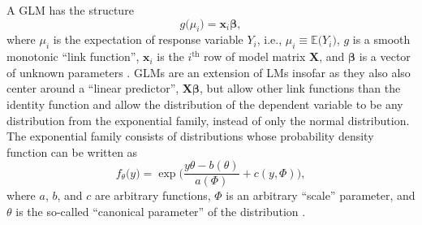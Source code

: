 A GLM has the structure
\begin{equation}
  \label{eq:GeneralizedLinearModel}
  g\bigl(\mu_i\bigr) = \symbf{x}_i \symbf{\beta},  %
\end{equation}
where \(\mu_i\) is the expectation of response variable \(Y_i\), i.e., \(\mu_i \equiv \mathbb{E}\bigl(Y_i\bigr)\), \(g\) is a smooth monotonic ``link function'', \(\symbf{x}_i\) is the \(i^{\text{th}}\) row of model matrix \(\symbf{X}\), and \(\symbf{\beta}\) is a vector of unknown parameters \parencite{Wood2006,Nelder1972}.
GLMs are an extension of LMs insofar as they also also center around a ``linear predictor'', \(\symbf{X}\symbf{\beta}\), but allow other link functions than the identity function and allow the distribution of the dependent variable to be any distribution from the exponential family, instead of only the normal distribution.  The exponential family consists of distributions whose probability density function can be written as
\begin{equation}
  \label{eq:ExponentialFamilyProbabilityDensityFunction}
  f_{\theta}\bigl(y\bigr) = \exp \bigg( \frac{y \theta - b(\theta)}{a(\Phi)} + c(y, \Phi)\bigg),
\end{equation}
where \(a\), \(b\), and \(c\) are arbitrary functions, \(\Phi\) is an arbitrary ``scale'' parameter, and \(\theta\) is the so-called ``canonical parameter'' of the distribution \parencite{Wood2006}.

